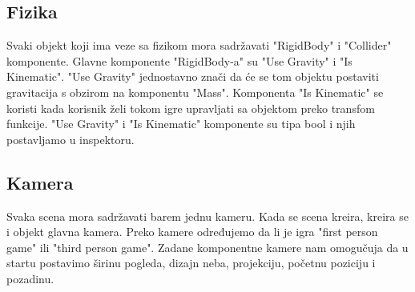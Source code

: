 \subsection{Fizika}
Svaki objekt koji ima veze sa fizikom mora sadržavati "RigidBody" i "Collider" komponente. Glavne komponente "RigidBody-a" su "Use Gravity" i "Is Kinematic".
"Use Gravity" jednostavno znači da će se tom objektu postaviti gravitacija s obzirom na komponentu "Mass". Komponenta "Is Kinematic" se koristi kada korisnik želi tokom igre upravljati sa objektom preko transfom funkcije. "Use Gravity" i "Is Kinematic" komponente su tipa bool i njih postavljamo u inspektoru.

\subsection{Kamera}
Svaka scena mora sadržavati barem jednu kameru. Kada se scena kreira, kreira se i objekt glavna kamera. Preko kamere određujemo da li je igra "first person game" ili "third person game". Zadane komponentne kamere nam omogučuja da u startu postavimo širinu pogleda, dizajn neba, projekciju, početnu poziciju i pozadinu.







